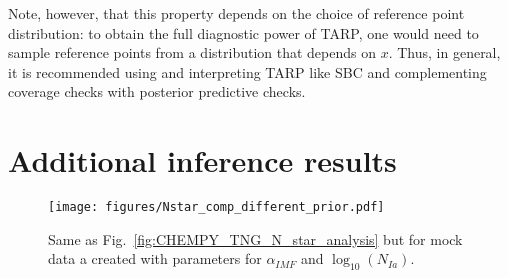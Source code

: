 \documentclass{aa}
\begin{document}
\begin{appendix}
Note, however, that this property depends on the choice of reference point distribution: to obtain the full diagnostic power of TARP, one would need to sample reference points from a distribution that depends on $x$. Thus, in general, it is recommended using and interpreting TARP like SBC and complementing coverage checks with posterior predictive checks.

\section{Additional inference results}

\begin{figure*}
    \centering
    \texttt{[image: figures/Nstar\_comp\_different\_prior.pdf]}
    \vspace{-.5cm}
    \caption{Same as Fig.~\ref{fig:CHEMPY_TNG_N_star_analysis} but for mock data a created with parameters for $\alpha_{IMF}$ and $\log_{10}(N_{Ia})$.}
    \label{fig:N_star_analysis_different_prior}
\end{figure*}

\end{appendix}
\end{document}

